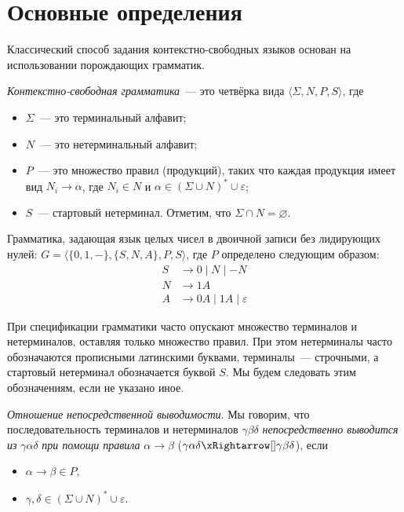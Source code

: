 \section{Основные определения}
\label{sec:CFGBasicDefinitions}

Классический способ задания контекстно-свободных языков основан на использовании порождающих грамматик.
\begin{definition}
    \emph{Контекстно-свободная грамматика}~--- это четвёрка вида $\langle \Sigma, N, P, S \rangle$, где
    \begin{itemize}
        \item $\Sigma$~--- это терминальный алфавит;
        \item $N$~--- это нетерминальный алфавит;
        \item $P$~--- это множество правил (продукций), таких что каждая продукция имеет вид $N_i \to \alpha$, где $N_i \in N$ и $\alpha \in (\Sigma \cup N)^* \cup {\varepsilon}$;
        \item $S$~--- стартовый нетерминал.
              Отметим, что $\Sigma \cap N = \varnothing$.
    \end{itemize}
\end{definition}

\begin{example}
    \label{exmpl:binary_cfg}
    Грамматика, задающая язык целых чисел в двоичной записи без лидирующих нулей: $G = \langle \{0, 1, -\}, \{S, N, A\}, P, S \rangle$, где $P$ определено следующим образом:
    \begin{align*}
        S & \rightarrow 0 \mid N \mid - N              \\
        N & \rightarrow 1 A                            \\
        A & \rightarrow 0 A \mid 1 A  \mid \varepsilon
    \end{align*}
\end{example}

При спецификации грамматики часто опускают множество терминалов и нетерминалов, оставляя только множество правил.
При этом нетерминалы часто обозначаются прописными латинскими буквами, терминалы~--- строчными, а стартовый нетерминал обозначается буквой $S$.
Мы будем следовать этим обозначениям, если не указано иное.

\begin{definition}
    \label{def:CFGDerivability}
    \emph{Отношение непосредственной выводимости}. Мы говорим, что последовательность терминалов и нетерминалов $\gamma \beta \delta$ \emph{непосредственно выводится из} $\gamma \alpha \delta$ \emph{при помощи правила} $\alpha \rightarrow \beta$ ($\gamma \alpha \delta \derives[] \gamma \beta \delta$), если
    \begin{itemize}
        \item $\alpha \rightarrow \beta \in P$,
        \item $\gamma, \delta \in (\Sigma \cup N)^* \cup {\varepsilon}$.
    \end{itemize}
\end{definition}

